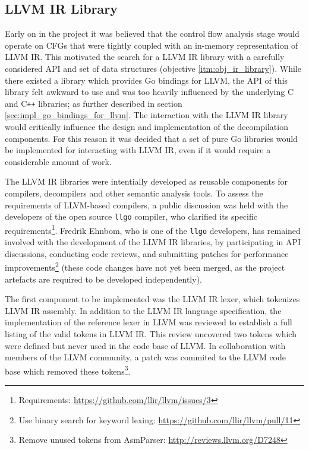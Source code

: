 
\subsection{LLVM IR Library}
\label{sec:impl_llvm_ir_library}

Early on in the project it was believed that the control flow analysis stage would operate on CFGs that were tightly coupled with an in-memory representation of LLVM IR. This motivated the search for a LLVM IR library with a carefully considered API and set of data structures (objective \ref{itm:obj_ir_library}). While there existed a library which provides Go bindings for LLVM, the API of this library felt awkward to use and was too heavily influenced by the underlying C and C\texttt{++} libraries; as further described in section \ref{sec:impl_go_bindings_for_llvm}. The interaction with the LLVM IR library would critically influence the design and implementation of the decompilation components. For this reason it was decided that a set of pure Go libraries would be implemented for interacting with LLVM IR, even if it would require a considerable amount of work.

The LLVM IR libraries were intentially developed as reusable components for compilers, decompilers and other semantic analysis tools. To assess the requirements of LLVM-based compilers, a public discussion was held with the developers of the open source \texttt{llgo} compiler, who clarified its specific requirements\footnote{Requirements: \url{https://github.com/llir/llvm/issues/3}}. Fredrik Ehnbom, who is one of the \texttt{llgo} developers, has remained involved with the development of the LLVM IR libraries, by participating in API discussions, conducting code reviews, and submitting patches for performance improvements\footnote{Use binary search for keyword lexing: \url{https://github.com/llir/llvm/pull/11}} (these code changes have not yet been merged, as the project artefacts are required to be developed independently).

The first component to be implemented was the LLVM IR lexer, which tokenizes LLVM IR assembly. In addition to the LLVM IR language specification, the implementation of the reference lexer in LLVM was reviewed to establish a full listing of the valid tokens in LLVM IR. This review uncovered two tokens which were defined but never used in the code base of LLVM. In collaboration with members of the LLVM community, a patch was commited to the LLVM code base which removed these tokens\footnote{Remove unused tokens from AsmParser: \url{http://reviews.llvm.org/D7248}}.

